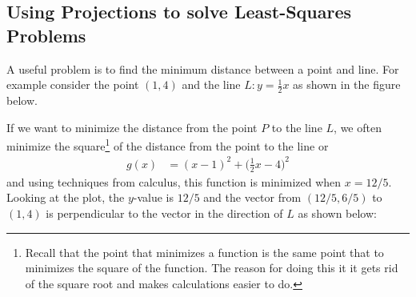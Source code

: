 \subsection{Using Projections to solve Least-Squares Problems}

A useful problem is to find the minimum distance between a point and line.  For example consider the point $(1,4)$ and the line $L:  y= \frac{1}{2} x$ as shown in the figure below.

\begin{center}
\end{center}

If we want to minimize the distance from the point $P$ to the line $L$, we often minimize the square\footnote{Recall that the point that minimizes a function is the same point that to minimizes the square of the function.  The reason for doing this it it gets rid of the square root and makes calculations easier to do.}  of the distance from the point to the line or
%
\begin{align*}
g(x) & = (x-1)^2 + \biggl(\frac{1}{2} x - 4\biggr)^2 
\end{align*} %
and using techniques from calculus, this function is minimized when $x=12/5$.  Looking at the plot, the $y$-value is $12/5$ and the vector from $(12/5,6/5)$ to $(1,4)$ is perpendicular to the vector in the direction of $L$ as shown below: 

\begin{center}
\end{center}

